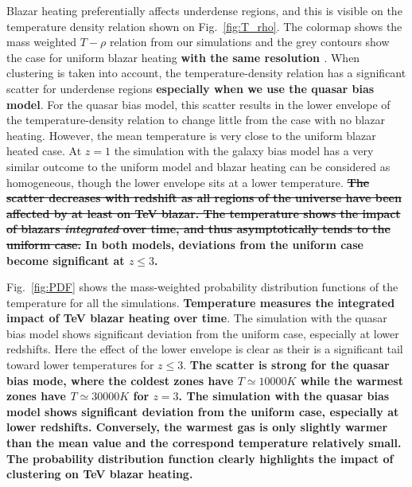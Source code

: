 \documentclass[twocolumns]{emulateapj}
\newcommand\ALc[1]{{\color{red} \bf #1}} %
\begin{document}
Blazar heating preferentially affects underdense regions, and this is visible on the temperature density relation shown on Fig.~\ref{fig:T_rho}. The colormap shows the mass weighted $T-\rho$ relation from our simulations and the grey contours show the case for uniform blazar heating  \ALc{with the same resolution \citep{2012MNRAS.423..149P}}. When clustering is taken into account, the temperature-density relation has a significant scatter for underdense regions \ALc{especially when we use the quasar bias model}. For the quasar bias model, this scatter results in the lower envelope of the temperature-density relation to change little from the case with no blazar heating.  However, the mean temperature is very close to the uniform blazar heated case. At $z=1$ the simulation with the galaxy bias model has a very similar outcome to the uniform model and  blazar heating can be considered as homogeneous, though the lower envelope sits at a lower temperature.  \ALc{\sout{The scatter decreases with redshift as all regions of the universe have been affected by at least on TeV blazar. The temperature shows the impact of blazars \textit{integrated} over time, and thus asymptotically tends to the uniform case. } In both models, deviations from the uniform case become significant at $z\leqslant 3$.}





Fig.~\ref{fig:PDF} shows the mass-weighted probability distribution functions of the temperature for all the simulations. \ALc{Temperature measures the integrated impact of TeV blazar heating over time}. The simulation with the quasar bias model shows significant deviation from the uniform case, especially at lower redshifts. Here the effect of the lower envelope is clear as their is a significant tail toward lower temperatures for $z \leqslant 3$. \ALc{The scatter is strong for the quasar bias mode, where the coldest zones have $T\simeq 10 000K$ while the warmest zones have $T\simeq 30 000K$ for $z=3$. The simulation with the quasar bias model shows significant deviation from the uniform case, especially at lower redshifts. Conversely, the warmest gas is only slightly warmer than the mean value and the correspond temperature relatively small. The probability distribution function clearly highlights the impact of clustering on TeV blazar heating.}
\end{document}

